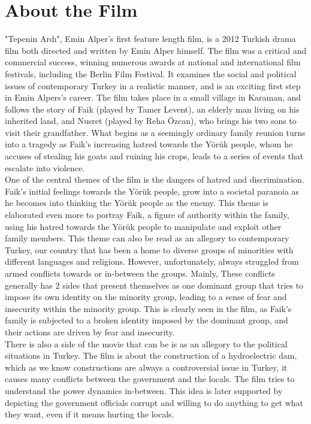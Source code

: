 \documentclass[12pt]{article}
\begin{document}
\section{About the Film}
\par
"Tepenin Ardı", Emin Alper's first feature length film, is a 2012 Turkish drama film both directed and written by Emin Alper himself. The film was a critical and commercial success, winning numerous awards at national and international film festivals, including the Berlin Film Festival. It examines the social and political issues of contemporary Turkey in a realistic manner, and is an exciting first step in Emin Alpers's career. The film takes place in a small village in Karaman, and follows the story of Faik (played by Tamer Levent), an elderly man living on his inherited land, and Nusret (played by Reha Özcan), who brings his two sons to visit their grandfather. What begins as a seemingly ordinary family reunion turns into a tragedy as Faik's increasing hatred towards the Yörük people, whom he accuses of stealing his goats and ruining his crops, leads to a series of events that escalate into violence.
\\
One of the central themes of the film is the dangers of hatred and discrimination. Faik's initial feelings towards the Yörük people, grow into a societal paranoia as he becomes into thinking the Yörük people as the enemy. This theme is elaborated even more to portray Faik, a figure of authority within the family, using his hatred towards the Yörük people to manipulate and exploit other family members. This theme can also be read as an allegory to contemporary Turkey, our country that has been a home to diverse groups of minorities with different languages and religions. However, unfortunately, always struggled from armed conflicts towards or in-between the groups. Mainly, These conflicts generally has 2 sides that present themselves as one dominant group that tries to impose its own identity on the minority group, leading to a sense of fear and insecurity within the minority group. This is clearly seen in the film, as Faik's family is subjected to a broken identity imposed by the dominant group, and their actions are driven by fear and insecurity.
\\
There is also a side of the movie that can be is as an allegory to the political situations in Turkey. The film is about the construction of a hydroelectric dam, which as we know constructions are always a controversial issue in Turkey, it causes many conflicts between the government and the locals. The film tries to understand the power dynamics in-between. This idea is later supported by depicting the government officials corrupt and willing to do anything to get what they want, even if it means hurting the locals.
\end{document}
